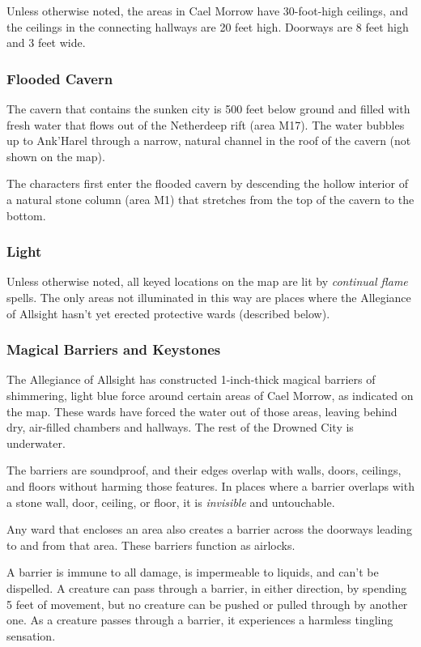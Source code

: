 \documentclass[a4paper, 11pt, bg=full, twocolumn, nooutline]{dndbook}
\begin{document}
Unless otherwise noted, the areas in Cael Morrow have 30-foot-high ceilings, and the ceilings in the connecting hallways are 20 feet high. Doorways are 8 feet high and 3 feet wide.

\subsubsection{Flooded Cavern}

The cavern that contains the sunken city is 500 feet below ground and filled with fresh water that flows out of the Netherdeep rift (area M17). The water bubbles up to Ank'Harel through a narrow, natural channel in the roof of the cavern (not shown on the map).

The characters first enter the flooded cavern by descending the hollow interior of a natural stone column (area M1) that stretches from the top of the cavern to the bottom.

\subsubsection{Light}

Unless otherwise noted, all keyed locations on the map are lit by \textit{continual flame} spells. The only areas not illuminated in this way are places where the Allegiance of Allsight hasn't yet erected protective wards (described below).

\subsubsection{Magical Barriers and Keystones}

The Allegiance of Allsight has constructed 1-inch-thick magical barriers of shimmering, light blue force around certain areas of Cael Morrow, as indicated on the map. These wards have forced the water out of those areas, leaving behind dry, air-filled chambers and hallways. The rest of the Drowned City is underwater.

The barriers are soundproof, and their edges overlap with walls, doors, ceilings, and floors without harming those features. In places where a barrier overlaps with a stone wall, door, ceiling, or floor, it is \textit{invisible} and untouchable.

Any ward that encloses an area also creates a barrier across the doorways leading to and from that area. These barriers function as airlocks.

A barrier is immune to all damage, is impermeable to liquids, and can't be dispelled. A creature can pass through a barrier, in either direction, by spending 5 feet of movement, but no creature can be pushed or pulled through by another one. As a creature passes through a barrier, it experiences a harmless tingling sensation.
\end{document}
